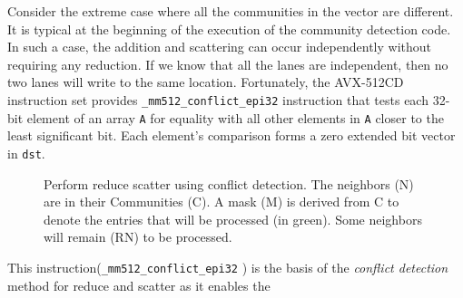 \documentclass[default,iicol]{sn-jnl}%
\theoremstyle{thmstyleone}%
\theoremstyle{thmstyletwo}%
\theoremstyle{thmstylethree}%
\begin{document}
Consider the extreme case where all the communities in the vector are different. It is typical at the beginning of the execution 
of the community detection code. In such a case, the addition and scattering can occur independently without requiring any reduction. 
If we know that all the lanes are independent, then no two lanes will write to the same location. 
Fortunately, the AVX-512CD instruction set provides \texttt{\_mm512\_conflict\_epi32} instruction that tests each 32-bit element 
of an array \texttt{A} for equality with all other elements in \texttt{A} closer to the least significant bit. 
Each element's comparison forms a zero extended bit vector in \texttt{dst}.
\begin{figure}[t]
  \centering
  \hspace{.05\linewidth}
  \caption{Perform reduce scatter using conflict detection. The neighbors (N) are  in their Communities (C). A mask (M) is derived from C 
  to denote the entries that will be processed (in green). Some neighbors will remain (RN) to be processed.
 }
  \label{fig:onpl_vector_lane_conflict}
\end{figure}
This instruction(\texttt{\_mm512\_conflict\_epi32} ) is the basis of the \textit{conflict detection} method for reduce and scatter as it enables the 
\end{document}
